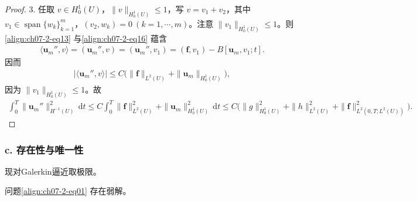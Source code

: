 \documentclass[../../main.tex]{subfiles}
\begin{document}
\begin{proof}
3. 任取 $v\in H^1_0(U)$，$\|v\|_{H^1_0(U)}\leqslant 1$，写 $v=v_1+v_2$，其中 $v_1\in\operatorname{span}\{w_k\}_{k=1}^m$，$(v_2,w_k)=0\ (k=1,\cdots,m)$。注意 $\|v_1\|_{H^1_0(U)}\leqslant 1$。则\eqref{align:ch07-2-eq13} 与\eqref{align:ch07-2-eq16} 蕴含
\begin{align*}
\langle\mathbf{u}_m'',v\rangle=(\mathbf{u}_m'',v)=(\mathbf{u}_m'',v_1)=(\mathbf{f},v_1)-B[\mathbf{u}_m,v_1;t].
\end{align*}
因而
\begin{align*}
|\langle\mathbf{u}_m'',v\rangle|\leqslant C\bigl(\|\mathbf{f}\|_{L^2(U)}+\|\mathbf{u}_m\|_{H^1_0(U)}\bigr),
\end{align*}
因为 $\|v_1\|_{H^1_0(U)}\leqslant 1$。故
\begin{align*}
\int_0^T \|\mathbf{u}_m''\|_{H^{-1}(U)}^2\,\mathrm{d}t \leqslant C\int_0^T \|\mathbf{f}\|_{L^2(U)}^2+\|\mathbf{u}_m\|_{H^1_0(U)}^2\,\mathrm{d}t
\leqslant C\bigl(\|g\|_{H^1_0(U)}^2+\|h\|_{L^2(U)}^2+\|\mathbf{f}\|_{L^2(0,T;L^2(U))}^2\bigr).
\end{align*}
\end{proof}

\subsubsection*{c. 存在性与唯一性}

现对Galerkin逼近取极限。

\begin{theorem}[弱解的存在性。]\label{theorem:ch07-2-弱解的存在性}问题\eqref{align:ch07-2-eq01} 存在弱解。
\end{theorem}
\end{document}
